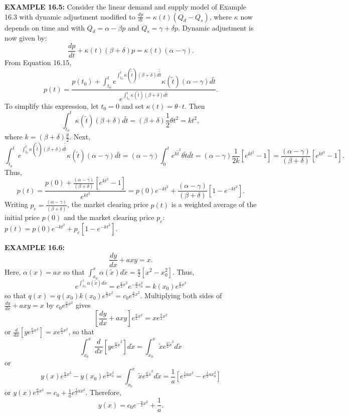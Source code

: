\begin{original}
\textbf{EXAMPLE 16.5:} Consider the linear demand and supply model of Example 16.3 with dynamic adjustment modified to $\frac{dp}{dt} = \kappa(t)(Q_d - Q_s)$, where $\kappa$ now depends on time and with $Q_d = \alpha - \beta p$ and $Q_s = \gamma + \delta p$. Dynamic adjustment is now given by:
\[
\frac{dp}{dt} + \kappa(t)(\beta + \delta)p = \kappa(t)(\alpha - \gamma).
\]
From Equation 16.15,
\[
p(t) = \frac{p(t_0) + \int_{t_0}^{t} e^{\int_{t_0}^{\tilde{t}} \kappa(\tilde{\tilde{t}})(\beta+\delta) d\tilde{\tilde{t}}} \kappa(\tilde{t})(\alpha - \gamma) d\tilde{t}}{e^{\int_{t_0}^{t} \kappa(\tilde{t})(\beta+\delta) d\tilde{t}}}.
\]
To simplify this expression, let $t_0 = 0$ and set $\kappa(t) = \theta \cdot t$. Then
\[
\int_{t_0}^{t} \kappa(\tilde{t})(\beta + \delta)d\tilde{t} = (\beta + \delta)\frac{1}{2}\theta t^2 = kt^2,
\]
where $k = (\beta + \delta)\frac{\theta}{2}$. Next,
\[
\int_{t_0}^{t} e^{\int_{t_0}^{\tilde{t}} \kappa(\tilde{\tilde{t}})(\beta+\delta)d\tilde{\tilde{t}}} \kappa(\tilde{t})(\alpha - \gamma) d\tilde{t} = (\alpha - \gamma) \int_{0}^{t} e^{k\tilde{t}^2}\theta\tilde{t} d\tilde{t}
= (\alpha - \gamma)\frac{1}{2k}\left[e^{k t^2} - 1\right] = \frac{(\alpha - \gamma)}{(\beta + \delta)} \left[e^{k t^2} - 1\right].
\]
Thus,
\[
p(t) = \frac{p(0) + \frac{(\alpha - \gamma)}{(\beta + \delta)}\left[e^{k t^2} - 1\right]}{e^{k t^2}} = p(0)e^{-k t^2} + \frac{(\alpha - \gamma)}{(\beta + \delta)}[1 - e^{-k t^2}].
\]
Writing $p_e = \frac{(\alpha - \gamma)}{(\beta + \delta)}$, the market clearing price $p(t)$ is a weighted average of the initial price $p(0)$ and the market clearing price $p_e$: $p(t) = p(0)e^{-k t^2} + p_e[1 - e^{-k t^2}]$.

\textbf{EXAMPLE 16.6:}
\[
\frac{dy}{dx} + axy = x.
\]
Here, $\alpha(x) = ax$ so that $\int_{x_0}^{x} \alpha(\tilde{x}) d\tilde{x} = \frac{a}{2}[x^2 - x_0^2]$. Thus,
\[
e^{\int_{x_0}^{x} \alpha(\tilde{x}) d\tilde{x}} = e^{\frac{a}{2}x^2} e^{-\frac{a}{2}x_0^2} = k(x_0) e^{\frac{a}{2}x^2}
\]
so that $q(x) = q(x_0)k(x_0)e^{\frac{a}{2}x^2} = c_0 e^{\frac{a}{2}x^2}$. Multiplying both sides of $\frac{dy}{dx} + axy = x$ by $c_0 e^{\frac{a}{2}x^2}$ gives
\[
\left[\frac{dy}{dx} + axy\right] e^{\frac{a}{2}x^2} = x e^{\frac{a}{2}x^2}
\]
or $\frac{d}{dx}\left[y e^{\frac{a}{2}x^2}\right] = x e^{\frac{a}{2}x^2}$, so that
\[
\int_{x_0}^{x} \frac{d}{d\tilde{x}}\left[y e^{\frac{a}{2}\tilde{x}^2}\right] d\tilde{x} = \int_{x_0}^{x} \tilde{x} e^{\frac{a}{2}\tilde{x}^2} d\tilde{x}
\]
or
\[
y(x)e^{\frac{a}{2}x^2} - y(x_0)e^{\frac{a}{2}x_0^2} = \int_{x_0}^{x} \tilde{x} e^{\frac{a}{2}\tilde{x}^2} d\tilde{x} = \frac{1}{a}\left[e^{\frac{1}{2}ax^2} - e^{\frac{1}{2}a x_0^2}\right]
\]
or $y(x)e^{\frac{a}{2}x^2} = c_0 + \frac{1}{a} e^{\frac{1}{2}ax^2}$. Therefore,
\[
y(x) = c_0 e^{-\frac{a}{2}x^2} + \frac{1}{a}.
\]
\end{original}
